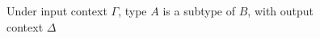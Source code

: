 \begin{figure*}[ht]
  \begin{subfigure}
     {Under input context $\Gamma$,
       type $A$ is a subtype of $B$, with output context $\Delta$}
\end{subfigure}
\end{figure*}
